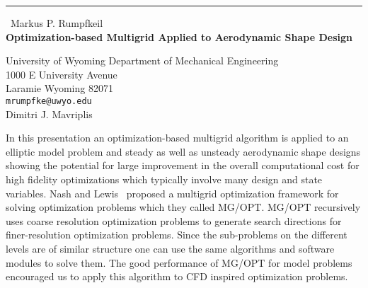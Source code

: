 \documentclass{report}
\begin{document}
\begin{center}
\rule{6in}{1pt} \
{\large Markus P. Rumpfkeil \\
{\bf Optimization-based Multigrid Applied to Aerodynamic Shape Design}}

University of Wyoming Department of Mechanical Engineering \\ 1000 E University Avenue \\ Laramie Wyoming 82071
\\
{\tt mrumpfke@uwyo.edu}\\
Dimitri J. Mavriplis\end{center}

In this presentation an optimization-based multigrid algorithm is applied
to an elliptic model problem and steady as well as unsteady aerodynamic
shape designs showing
the potential for large improvement in the overall computational cost for
high fidelity optimizations which typically involve many design
and state variables. Nash and Lewis~\cite{Lewis2005} proposed a multigrid
optimization framework for solving optimization problems which they
called MG/OPT.
MG/OPT recursively uses coarse resolution optimization problems to
generate search directions for finer-resolution optimization problems.
Since the sub-problems on the different levels are of similar structure
one can use the same algorithms and software modules to solve them. The
good performance of MG/OPT for model problems~\cite{Lewis2005} encouraged
us to apply this algorithm to CFD inspired optimization problems.
\end{document}

